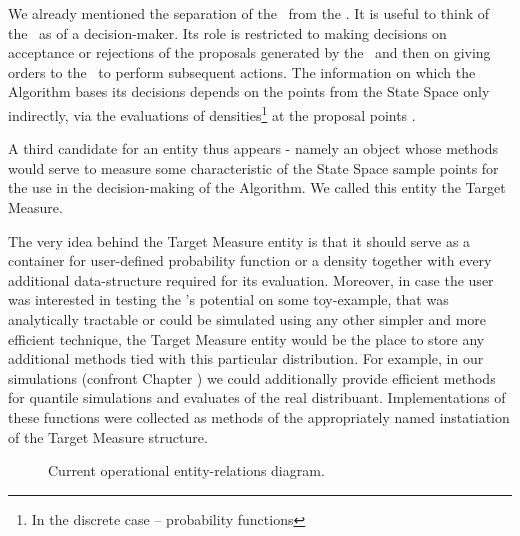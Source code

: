 \documentclass{book}
\begin{document}
We already mentioned the separation of the \algo\, from the \sspace. It is useful to think of the \algo\, as of a decision-maker. Its role is restricted to making decisions on acceptance or rejections of the proposals generated by the \sspace\, and then on giving orders to the \sspace\, to perform subsequent actions. The information on which the Algorithm bases its decisions depends on the points from the State Space only indirectly, via the evaluations of densities\footnote{In the discrete case -- probability functions} at the proposal points .

 A third candidate for an entity thus appears - namely an object whose methods would serve to measure some characteristic of the State Space sample points for the use in the decision-making of the Algorithm. We called this entity the Target Measure. 

The very idea behind the Target Measure entity is that it should serve as a container for user-defined probability function or a density together with every additional data-structure required for its evaluation. Moreover, in case the user was interested in testing the \PT's potential on some toy-example, that was analytically tractable or could be simulated using any other simpler and more efficient technique, the Target Measure entity would be the place to store any additional methods tied with this particular distribution. For example, in our simulations (confront Chapter ) we could  additionally provide efficient methods for quantile simulations and evaluates of the real distribuant. Implementations of these functions were collected as methods of the appropriately named instatiation of the Target Measure structure.  



\begin{figure}
	\caption{Current operational entity-relations diagram.}\label{objectStructure}
\end{figure}
\end{document}
